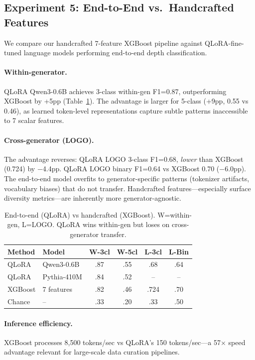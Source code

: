 \documentclass[11pt,a4paper]{article}
\begin{document}
\subsection{Experiment 5: End-to-End vs.\ Handcrafted Features}
\label{sec:exp5}

We compare our handcrafted 7-feature XGBoost pipeline against QLoRA-fine-tuned language models performing end-to-end depth classification.

\paragraph{Within-generator.} QLoRA Qwen3-0.6B achieves 3-class within-gen F1=0.87, outperforming XGBoost by +5pp (Table~\ref{tab:e2e}). The advantage is larger for 5-class (+9pp, 0.55 vs 0.46), as learned token-level representations capture subtle patterns inaccessible to 7 scalar features.

\paragraph{Cross-generator (LOGO).} The advantage reverses: QLoRA LOGO 3-class F1=0.68, \emph{lower} than XGBoost (0.724) by $-$4.4pp. QLoRA LOGO binary F1=0.64 vs XGBoost 0.70 ($-$6.0pp). The end-to-end model overfits to generator-specific patterns (tokenizer artifacts, vocabulary biases) that do not transfer. Handcrafted features---especially surface diversity metrics---are inherently more generator-agnostic.

\begin{table}[t]
\centering
\small
\begin{tabular}{llcccc}
\toprule
Method & Model & W-3cl & W-5cl & L-3cl & L-Bin \\
\midrule
QLoRA & Qwen3-0.6B & .87 & .55 & .68 & .64 \\
QLoRA & Pythia-410M & .84 & .52 & -- & -- \\
XGBoost & 7 features & .82 & .46 & .724 & .70 \\
Chance & -- & .33 & .20 & .33 & .50 \\
\bottomrule
\end{tabular}
\caption{End-to-end (QLoRA) vs handcrafted (XGBoost). W=within-gen, L=LOGO. QLoRA wins within-gen but loses on cross-generator transfer.}
\label{tab:e2e}
\end{table}

\paragraph{Inference efficiency.} XGBoost processes 8,500 tokens/sec vs QLoRA's 150 tokens/sec---a 57$\times$ speed advantage relevant for large-scale data curation pipelines.
\end{document}
